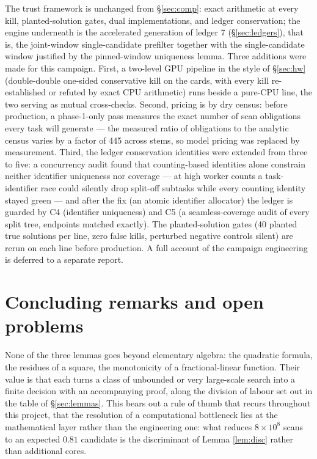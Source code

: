 \documentclass[11pt]{article}
\theoremstyle{remark}
\begin{document}
The trust framework is unchanged from \S\ref{sec:comp}: exact arithmetic at every kill, planted-solution gates, dual implementations, and ledger conservation; the engine underneath is the accelerated generation of ledger 7 (\S\ref{sec:ledgers}), that is, the joint-window single-candidate prefilter together with the single-candidate window justified by the pinned-window uniqueness lemma. Three additions were made for this campaign. First, a two-level GPU pipeline in the style of \S\ref{sec:hw} (double-double one-sided conservative kill on the cards, with every kill re-established or refuted by exact CPU arithmetic) runs beside a pure-CPU line, the two serving as mutual cross-checks. Second, pricing is by dry census: before production, a phase-1-only pass measures the exact number of scan obligations every task will generate --- the measured ratio of obligations to the analytic census varies by a factor of 445 across stems, so model pricing was replaced by measurement. Third, the ledger conservation identities were extended from three to five: a concurrency audit found that counting-based identities alone constrain neither identifier uniqueness nor coverage --- at high worker counts a task-identifier race could silently drop split-off subtasks while every counting identity stayed green --- and after the fix (an atomic identifier allocator) the ledger is guarded by C4 (identifier uniqueness) and C5 (a seamless-coverage audit of every split tree, endpoints matched exactly). The planted-solution gates (40 planted true solutions per line, zero false kills, perturbed negative controls silent) are rerun on each line before production. A full account of the campaign engineering is deferred to a separate report.

\section{Concluding remarks and open problems}\label{sec:concl}

None of the three lemmas goes beyond elementary algebra: the quadratic formula, the residues of a square, the monotonicity of a fractional-linear function. Their value is that each turns a class of unbounded or very large-scale search into a finite decision with an accompanying proof, along the division of labour set out in the table of \S\ref{sec:lemmas}. This bears out a rule of thumb that recurs throughout this project, that the resolution of a computational bottleneck lies at the mathematical layer rather than the engineering one: what reduces $8 \times 10^8$ scans to an expected $0.81$ candidate is the discriminant of Lemma \ref{lem:disc} rather than additional cores.
\end{document}
